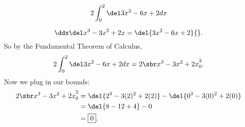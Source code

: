 \renewcommand{\avibounds}{_0^2}
\renewcommand{\avifn}{\del{3x^2 - 6x + 2}}
\renewcommand{\avianti}{x^3 - 3x^2 + 2x}

\begin{probboxed}
    \[
        \aviprob{}
    \]
\end{probboxed}

\aviinversepowerrule
\[
    \ddx\del\avianti{} = \avifn{}.
\]
So by the Fundamental Theorem of Calculus,
\[
    \aviprob{}
    = \avibounded{}.
\]
Now we plug in our bounds:
\begin{align*}
    \avibounded{}
    &= \del{2^3 - 3(2)^2 + 2(2)} - \del{0^3 - 3(0)^2 + 2(0)} \\
    &= \del{8 - 12 + 4} - 0 \\
    &= \boxed{0}.
\end{align*}
